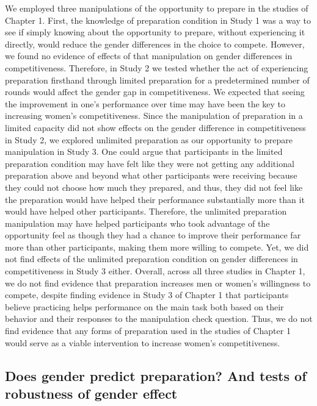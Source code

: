 \documentclass[a4paper, nobind]{templates/ociamthesis}
\begin{document}
We employed three manipulations of the opportunity to prepare in the studies of Chapter 1. First, the knowledge of preparation condition in Study 1 was a way to see if simply knowing about the opportunity to prepare, without experiencing it directly, would reduce the gender differences in the choice to compete. However, we found no evidence of effects of that manipulation on gender differences in competitiveness. Therefore, in Study 2 we tested whether the act of experiencing preparation firsthand through limited preparation for a predetermined number of rounds would affect the gender gap in competitiveness. We expected that seeing the improvement in one's performance over time may have been the key to increasing women's competitiveness. Since the manipulation of preparation in a limited capacity did not show effects on the gender difference in competitiveness in Study 2, we explored unlimited preparation as our opportunity to prepare manipulation in Study 3. One could argue that participants in the limited preparation condition may have felt like they were not getting any additional preparation above and beyond what other participants were receiving because they could not choose how much they prepared, and thus, they did not feel like the preparation would have helped their performance substantially more than it would have helped other participants. Therefore, the unlimited preparation manipulation may have helped participants who took advantage of the opportunity feel as though they had a chance to improve their performance far more than other participants, making them more willing to compete. Yet, we did not find effects of the unlimited preparation condition on gender differences in competitiveness in Study 3 either. Overall, across all three studies in Chapter 1, we do not find evidence that preparation increases men or women's willingness to compete, despite finding evidence in Study 3 of Chapter 1 that participants believe practicing helps performance on the main task both based on their behavior and their responses to the manipulation check question. Thus, we do not find evidence that any forms of preparation used in the studies of Chapter 1 would serve as a viable intervention to increase women's competitiveness.

\hypertarget{does-gender-predict-preparation-and-tests-of-robustness-of-gender-effect}{%
\subsection{Does gender predict preparation? And tests of robustness of gender effect}\label{does-gender-predict-preparation-and-tests-of-robustness-of-gender-effect}}
\end{document}
